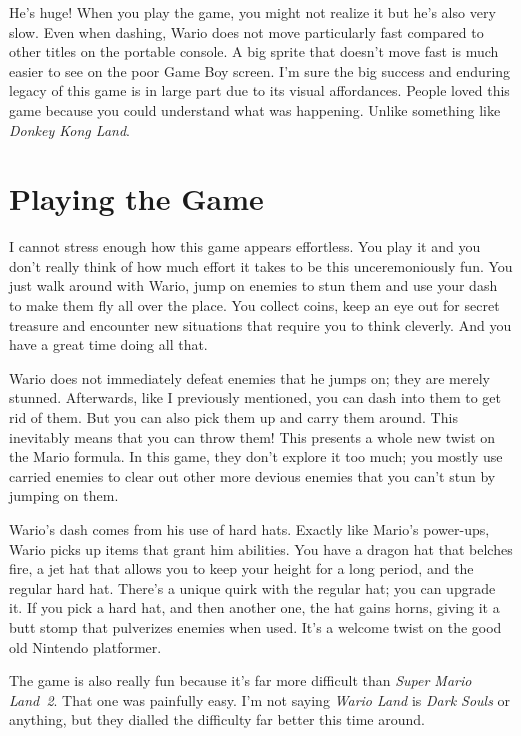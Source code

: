 \documentclass{book}
\begin{document}
He’s huge! When you play the game, you might not realize it but he’s also very slow. Even when dashing, Wario does not move particularly fast compared to other titles on the portable console. A big sprite that doesn’t move fast is much easier to see on the poor Game Boy screen. I’m sure the big success and enduring legacy of this game is in large part due to its visual affordances. People loved this game because you could understand what was happening. Unlike something like \emph{Donkey Kong Land}.

\FloatBarrier\needspace{10mm}\section*{Playing the Game}\nopagebreak[4]

I cannot stress enough how this game appears effortless. You play it and you don’t really think of how much effort it takes to be this unceremoniously fun. You just walk around with Wario, jump on enemies to stun them and use your dash to make them fly all over the place. You collect coins, keep an eye out for secret treasure and encounter new situations that require you to think cleverly. And you have a great time doing all that.

Wario does not immediately defeat enemies that he jumps on; they are merely stunned. Afterwards, like I previously mentioned, you can dash into them to get rid of them. But you can also pick them up and carry them around. This inevitably means that you can throw them! This presents a whole new twist on the Mario formula. In this game, they don’t explore it too much; you mostly use carried enemies to clear out other more devious enemies that you can’t stun by jumping on them.

Wario’s dash comes from his use of hard hats. Exactly like Mario’s power-ups, Wario picks up items that grant him abilities. You have a dragon hat that belches fire, a jet hat that allows you to keep your height for a long period, and the regular hard hat. There’s a unique quirk with the regular hat; you can upgrade it. If you pick a hard hat, and then another one, the hat gains horns, giving it a butt stomp that pulverizes enemies when used. It’s a welcome twist on the good old Nintendo platformer.

The game is also really fun because it’s far more difficult than \emph{Super Mario Land~2}. That one was painfully easy. I’m not saying \emph{Wario Land} is \emph{Dark Souls} or anything, but they dialled the difficulty far better this time around.
\end{document}
